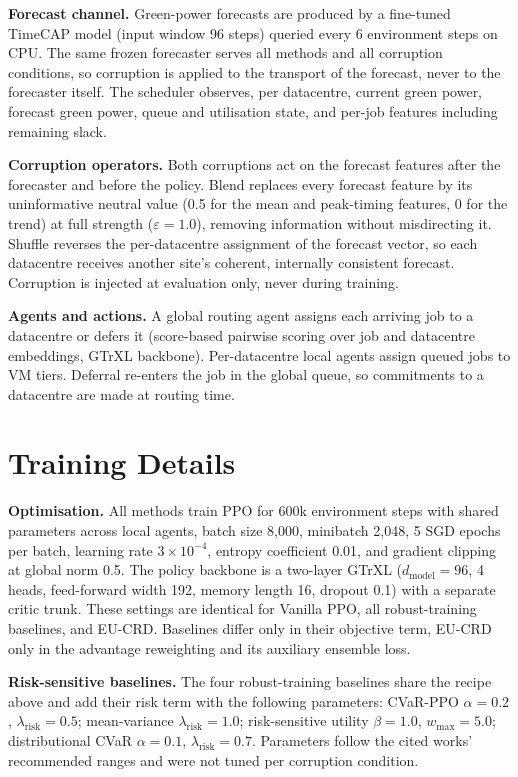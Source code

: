 \textbf{Forecast channel.} Green-power forecasts are produced by a fine-tuned TimeCAP model (input window 96 steps) queried every 6 environment steps on CPU. The same frozen forecaster serves all methods and all corruption conditions, so corruption is applied to the transport of the forecast, never to the forecaster itself. The scheduler observes, per datacentre, current green power, forecast green power, queue and utilisation state, and per-job features including remaining slack.

\textbf{Corruption operators.} Both corruptions act on the forecast features after the forecaster and before the policy. Blend replaces every forecast feature by its uninformative neutral value (0.5 for the mean and peak-timing features, 0 for the trend) at full strength ($\varepsilon{=}1.0$), removing information without misdirecting it. Shuffle reverses the per-datacentre assignment of the forecast vector, so each datacentre receives another site's coherent, internally consistent forecast. Corruption is injected at evaluation only, never during training.

\textbf{Agents and actions.} A global routing agent assigns each arriving job to a datacentre or defers it (score-based pairwise scoring over job and datacentre embeddings, GTrXL backbone). Per-datacentre local agents assign queued jobs to VM tiers. Deferral re-enters the job in the global queue, so commitments to a datacentre are made at routing time.

\section{Training Details}
\label{app:training}

\textbf{Optimisation.} All methods train PPO for 600k environment steps with shared parameters across local agents, batch size 8{,}000, minibatch 2{,}048, 5 SGD epochs per batch, learning rate $3\times10^{-4}$, entropy coefficient 0.01, and gradient clipping at global norm 0.5. The policy backbone is a two-layer GTrXL ($d_{\text{model}}=96$, 4 heads, feed-forward width 192, memory length 16, dropout 0.1) with a separate critic trunk. These settings are identical for Vanilla PPO, all robust-training baselines, and EU-CRD. Baselines differ only in their objective term, EU-CRD only in the advantage reweighting and its auxiliary ensemble loss.

\textbf{Risk-sensitive baselines.} The four robust-training baselines share the recipe above and add their risk term with the following parameters: CVaR-PPO $\alpha{=}0.2$, $\lambda_{\text{risk}}{=}0.5$; mean-variance $\lambda_{\text{risk}}{=}1.0$; risk-sensitive utility $\beta{=}1.0$, $w_{\max}{=}5.0$; distributional CVaR $\alpha{=}0.1$, $\lambda_{\text{risk}}{=}0.7$. Parameters follow the cited works' recommended ranges and were not tuned per corruption condition.

